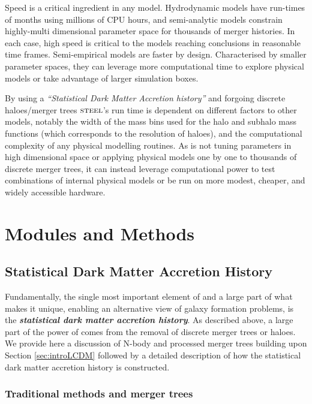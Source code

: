 Speed is a critical ingredient in any model. Hydrodynamic models have run-times of months using millions of CPU hours, and semi-analytic models constrain highly-multi dimensional parameter space for thousands of merger histories. In each case, high speed is critical to the models reaching conclusions in reasonable time frames. Semi-empirical models are faster by design. Characterised by smaller parameter spaces, they can leverage more computational time to explore physical models or take advantage of larger simulation boxes. 

By using a \textit{``Statistical Dark Matter Accretion history''} and forgoing discrete haloes/merger trees $\textsc{steel}$'s run time is dependent on different factors to other models, notably the width of the mass bins used for the halo and subhalo mass functions (which corresponds to the resolution of haloes), and the computational complexity of any physical modelling routines. As \steel is not tuning parameters in high dimensional space or applying physical models one by one to thousands of discrete merger trees, it can instead leverage computational power to test combinations of internal physical models or be run on more modest, cheaper, and widely accessible hardware.

\section{Modules and Methods}

\subsection{Statistical Dark Matter Accretion History}
\label{subsec:SDMAH}

Fundamentally, the single most important element of \steel and a large part of what makes it unique, enabling an alternative view of galaxy formation problems, is the \textbf{\textit{statistical dark matter accretion history}}. As described above, a large part of the power of \steel comes from the removal of discrete merger trees or haloes. We provide here a discussion of N-body and processed merger trees building upon Section \ref{sec:introLCDM} followed by a detailed description of how the statistical dark matter accretion history is constructed.

\subsubsection{Traditional methods and merger trees}

